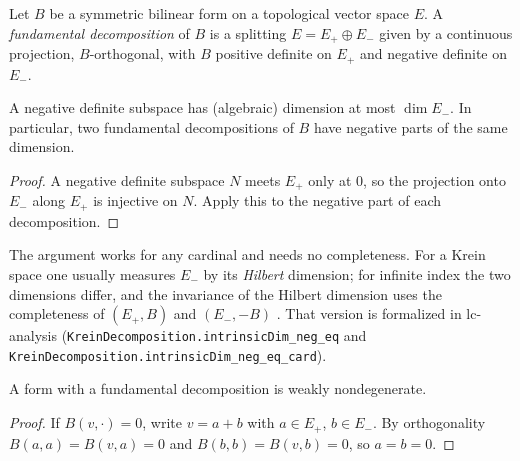 \begin{definition}
  \label{def:fundamental-decomposition}
  \leanok
  Let $B$ be a symmetric bilinear form on a topological vector space $E$. A \emph{fundamental
  decomposition} of $B$ is a splitting $E = E_+ \oplus E_-$ given by a continuous projection,
  $B$-orthogonal, with $B$ positive definite on $E_+$ and negative definite on $E_-$.
\end{definition}

\begin{theorem}
  \label{thm:mt-index}
  \leanok
  A negative definite subspace has (algebraic) dimension at most $\dim E_-$. In particular, two
  fundamental decompositions of $B$ have negative parts of the same dimension.
\end{theorem}

\begin{proof}
  \leanok
  A negative definite subspace $N$ meets $E_+$ only at $0$, so the projection onto $E_-$ along
  $E_+$ is injective on $N$. Apply this to the negative part of each decomposition.
\end{proof}

\begin{remark}
  The argument works for any cardinal and needs no completeness. For a Krein space one usually
  measures $E_-$ by its \emph{Hilbert} dimension; for infinite index the two dimensions differ, and
  the invariance of the Hilbert dimension uses the completeness of $(E_+, B)$ and $(E_-, -B)$
  \cite[Corollary~IV.7.4]{Bog74}. That version is formalized in lc-analysis
  (\texttt{KreinDecomposition.intrinsicDim\_neg\_eq} and
  \texttt{KreinDecomposition.intrinsicDim\_neg\_eq\_card}).
\end{remark}

\begin{proposition}
  \label{prop:mt-nondegenerate}
  \leanok
  A form with a fundamental decomposition is weakly nondegenerate.
\end{proposition}

\begin{proof}
  \leanok
  If $B(v, \cdot) = 0$, write $v = a + b$ with $a \in E_+$, $b \in E_-$. By orthogonality
  $B(a,a) = B(v,a) = 0$ and $B(b,b) = B(v,b) = 0$, so $a = b = 0$.
\end{proof}

